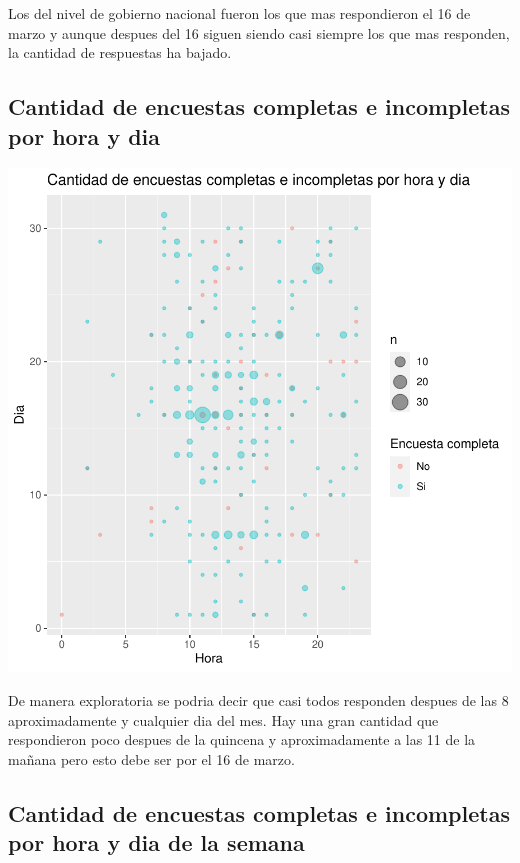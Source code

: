 \documentclass{article}
\begin{document}
Los del nivel de gobierno nacional fueron los que mas respondieron el 16 de marzo y aunque despues del 16 siguen siendo casi siempre los que mas responden, la cantidad de respuestas ha bajado.

\subsection{Cantidad de encuestas completas e incompletas por hora y dia}

\includegraphics{seguimientov3-070}

De manera exploratoria se podria decir que casi todos responden despues de las 8 aproximadamente y cualquier dia del mes. Hay una gran cantidad que respondieron poco despues de la quincena y aproximadamente a las 11 de la mañana pero esto debe ser por el 16 de marzo.

\subsection{Cantidad de encuestas completas e incompletas por hora y dia de la semana}
\end{document}
